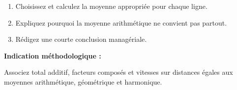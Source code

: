 \documentclass[11pt,a4paper]{article}
\newcommand{\tightlist}{\setlength{\itemsep}{0pt}\setlength{\parskip}{0pt}}
\begin{document}
\begin{enumerate}
\tightlist
\item
  Choisissez et calculez la moyenne appropriée pour chaque ligne.
\item
  Expliquez pourquoi la moyenne arithmétique ne convient pas partout.
\item
  Rédigez une courte conclusion managériale.
\end{enumerate}

\textbf{Indication méthodologique :}

Associez total additif, facteurs composés et vitesses sur distances égales aux moyennes arithmétique, géométrique et harmonique.
\end{document}
